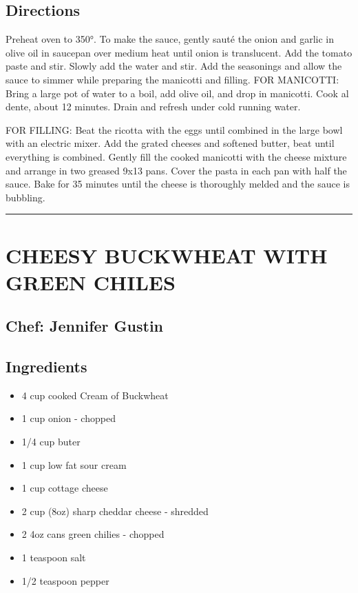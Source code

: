\documentclass[
]{book}
\providecommand{\tightlist}{%
  \setlength{\itemsep}{0pt}\setlength{\parskip}{0pt}}
\begin{document}
\hypertarget{directions-46}{%
\subsection*{Directions}\label{directions-46}}


Preheat oven to 350°. To make the sauce, gently sauté the onion and garlic in olive oil in saucepan over medium heat until onion is translucent. Add the tomato paste and stir. Slowly add the water and stir. Add the seasonings and allow the sauce to simmer while preparing the manicotti and filling. FOR MANICOTTI: Bring a large pot of water to a boil, add olive oil, and drop in manicotti. Cook al dente, about 12 minutes. Drain and refresh under cold running water.

FOR FILLING: Beat the ricotta with the eggs until combined in the large bowl with an electric mixer. Add the grated cheeses and softened butter, beat until everything is combined. Gently fill the cooked manicotti with the cheese mixture and arrange in two greased 9x13 pans. Cover the pasta in each pan with half the sauce. Bake for 35 minutes until the cheese is thoroughly melded and the sauce is bubbling.

\begin{center}\rule{0.5\linewidth}{0.5pt}\end{center}

\hypertarget{cheesy-buckwheat-with-green-chiles}{%
\section*{CHEESY BUCKWHEAT WITH GREEN CHILES}\label{cheesy-buckwheat-with-green-chiles}}


\hypertarget{chef-jennifer-gustin-7}{%
\subsection*{Chef: Jennifer Gustin}\label{chef-jennifer-gustin-7}}


\hypertarget{ingredients-47}{%
\subsection*{Ingredients}\label{ingredients-47}}


\begin{itemize}
\tightlist
\item
  4 cup cooked Cream of Buckwheat
\item
  1 cup onion - chopped
\item
  1/4 cup buter
\item
  1 cup low fat sour cream
\item
  1 cup cottage cheese
\item
  2 cup (8oz) sharp cheddar cheese - shredded
\item
  2 4oz cans green chilies - chopped
\item
  1 teaspoon salt
\item
  1/2 teaspoon pepper
\end{itemize}
\end{document}

